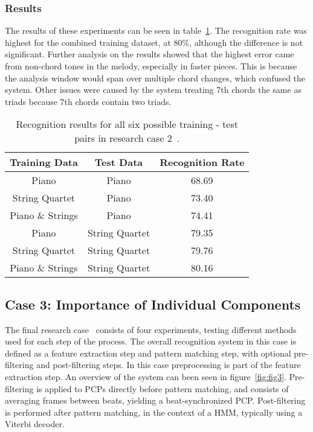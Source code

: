 \documentclass{sig-alternate}
\begin{document}
\subsubsection{Results}

The results of these experiments can be seen in table~\ref{tab:tab5}. The recognition rate was highest for the combined training dataset, at 80\%, although the difference is not significant. Further analysis on the results showed that the highest error came from non-chord tones in the melody, especially in faster pieces. This is because the analysis window would span over multiple chord changes, which confused the system. Other issues were caused by the system treating 7th chords the same as triads because 7th chords contain two triads.

\begin{table}
\centering
\begin{tabular}{|c|c|c|} \hline
\textbf{Training Data} & \textbf{Test Data} & \textbf{Recognition Rate} \\ \hline
Piano & Piano & 68.69 \\ \hline
String Quartet & Piano & 73.40 \\ \hline
Piano \& Strings & Piano & 74.41 \\ \hline
Piano & String Quartet & 79.35 \\ \hline
String Quartet & String Quartet & 79.76 \\ \hline
Piano \& Strings & String Quartet & 80.16 \\ \hline
\end{tabular}
\caption{Recognition results for all six possible training - test pairs in research case 2~\cite{Lee:2006}.}
\label{tab:tab5}
\end{table}

\subsection{Case 3: Importance of Individual Components}

The final research case~\cite{TaeMin:2014} consists of four experiments, testing different methods used for each step of the process. The overall recognition system in this case is defined as a feature extraction step and pattern matching step, with optional pre-filtering and post-filtering steps. In this case preprocessing is part of the feature extraction step. An overview of the system can been seen in figure~\ref{fig:fig3}. Pre-filtering is applied to PCPs directly before pattern matching, and consists of averaging frames between beats, yielding a beat-synchronized PCP. Post-filtering is performed after pattern matching, in the context of a HMM, typically using a Viterbi decoder.
\end{document}
